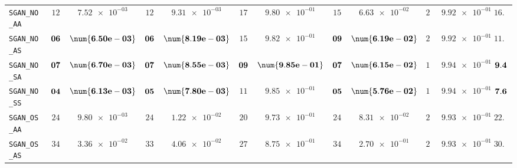 \begin{xltabular}{\textwidth}{l||cC|cC|cC|cC|cC||c}
	\texttt{SGAN\_NO\_AA} & $ 12$ & $ \num{7.52e-03}$ & $ 12$ & $ \num{9.31e-03}$ & $ 17$ & $ \num{9.80e-01}$ & $ 15$ & $ \num{6.63e-02}$ & $ 24$ & $ \num{9.92e-01}$ & $ 16.0$  \\
	\texttt{SGAN\_NO\_AS} & $\bf 06$ & $\bf \num{6.50e-03}$ & $\bf 06$ & $\bf \num{8.19e-03}$ & $ 15$ & $ \num{9.82e-01}$ & $\bf 09$ & $\bf \num{6.19e-02}$ & $ 23$ & $ \num{9.92e-01}$ & $ 11.8$  \\
	\texttt{SGAN\_NO\_SA} & $\bf 07$ & $\bf \num{6.70e-03}$ & $\bf 07$ & $\bf \num{8.55e-03}$ & $\bf 09$ & $\bf \num{9.85e-01}$ & $\bf 07$ & $\bf \num{6.15e-02}$ & $ 17$ & $ \num{9.94e-01}$ & $\bf 9.4$  \\
	\texttt{SGAN\_NO\_SS} & $\bf 04$ & $\bf \num{6.13e-03}$ & $\bf 05$ & $\bf \num{7.80e-03}$ & $ 11$ & $ \num{9.85e-01}$ & $\bf 05$ & $\bf \num{5.76e-02}$ & $ 13$ & $ \num{9.94e-01}$ & $\bf 7.6$  \\
	\texttt{SGAN\_OS\_AA} & $ 24$ & $ \num{9.80e-03}$ & $ 24$ & $ \num{1.22e-02}$ & $ 20$ & $ \num{9.73e-01}$ & $ 24$ & $ \num{8.31e-02}$ & $ 21$ & $ \num{9.93e-01}$ & $ 22.6$  \\
	\texttt{SGAN\_OS\_AS} & $ 34$ & $ \num{3.36e-02}$ & $ 33$ & $ \num{4.06e-02}$ & $ 27$ & $ \num{8.75e-01}$ & $ 34$ & $ \num{2.70e-01}$ & $ 22$ & $ \num{9.93e-01}$ & $ 30.0$  \\

\end{xltabular}

